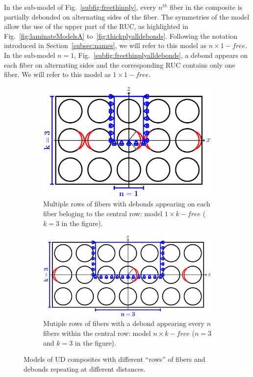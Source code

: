 \documentclass[review]{elsarticle}
\begin{document}
In the sub-model of Fig.~\ref{subfig:freethinply}, every $n^{th}$ fiber in the composite is partially debonded on alternating sides of the fiber. The symmetries of the model allow the use of the upper part of the RUC, as highlighted in Fig.~\ref{fig:laminateModelsA} to~\ref{fig:thickplyalldebonds}. Following the notation introduced in Section~\ref{subsec:names}, we will refer to this model as $n\times 1-free$. In the sub-model $n=1$, Fig.~\ref{subfig:freethinplyalldebonds}, a debond appears on each fiber on alternating sides and the corresponding RUC contains only one fiber. We will refer to this model as $1\times 1-free$.

\begin{figure}[!h]
\centering
    \begin{subfigure}[b]{\textwidth}
    \centering
        \includegraphics[height=0.3\textheight]{thickPlycentraldebondsline.pdf}
        \caption{Multiple rows of fibers with debonds appearing on each fiber beloging to the central row: model $1\times k-free$ ($k=3$ in the figure).}\label{subfig:thickplycentraldebonds}
    \end{subfigure}

    \begin{subfigure}[b]{\textwidth}
        \includegraphics[width=\textwidth]{thickPly.pdf}
        \caption{Mutiple rows of fibers with a debond appearing every $n$ fibers within the central row: model $n\times k-free$ ($n=3$ and $k=3$ in the figure).}\label{subfig:thickply}
    \end{subfigure}

\caption{Models of UD composites with different ``rows'' of fibers and debonds repeating at different distances.}\label{fig:laminateModelsB}
\end{figure}
\end{document}
